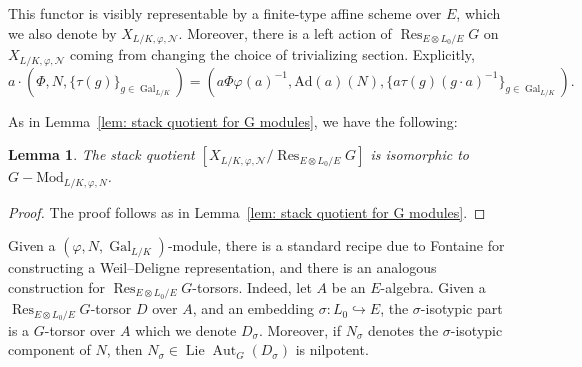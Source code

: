 \documentclass{amsart}
\def\Ad{\mathrm{Ad}}
\DeclareMathOperator{\Lie}{Lie}
\newtheorem{lem}[subsubsection]{Lemma}
\theoremstyle{definition}
\theoremstyle{remark}
\DeclareMathOperator{\Aut}{Aut}
\DeclareMathOperator{\Gal}{Gal}
\newcommand{\Res}{\operatorname{Res}}
\begin{document}
This functor is visibly representable by a finite-type
affine scheme over $E$, which we also denote by
$X_{L/K,\varphi,\mathcal N}$.  Moreover,
there is a left action of $\Res_{E\otimes L_0/E}G$ on
$X_{L/K,\varphi,\mathcal N}$ coming from changing the choice of trivializing
section.  Explicitly, \[ a\cdot (\Phi,N,\{\tau(g)\}_{g\in\Gal_{L/K}})
= (a\Phi\varphi(a)^{-1},\Ad(a)(N),\{a\tau(g)(g\cdot a)^{-1}\}_{g\in\Gal_{L/K}}).
\]

As in Lemma~\ref{lem: stack quotient for G modules}, we have the following:
\begin{lem}
  The stack quotient $[X_{L/K,\varphi,\mathcal N}/\Res_{E\otimes L_0/E}G]$ is
  isomorphic to $G-\mathrm{Mod}_{L/K,\varphi,N}$.
\end{lem}
\begin{proof}
  The proof follows as in Lemma~\ref{lem: stack quotient for G modules}.
\end{proof}

Given a $(\varphi,N,\Gal_{L/K})$-module, there is a standard recipe
due to Fontaine
for constructing a Weil--Deligne representation, and there is an
analogous construction for $\Res_{E\otimes L_0/E}G$-torsors.  Indeed,
let $A$ be an $E$-algebra.  Given a $\Res_{E\otimes L_0/E}G$-torsor
$D$ over $A$, and an embedding $\sigma:L_0\hookrightarrow E$, the $\sigma$-isotypic part is a $G$-torsor over $A$
which we denote $D_\sigma$.  Moreover, if $N_\sigma$ denotes the
$\sigma$-isotypic component of $N$, then $N_\sigma\in\Lie\Aut_G(D_\sigma)$ is nilpotent.
  
\end{document}
